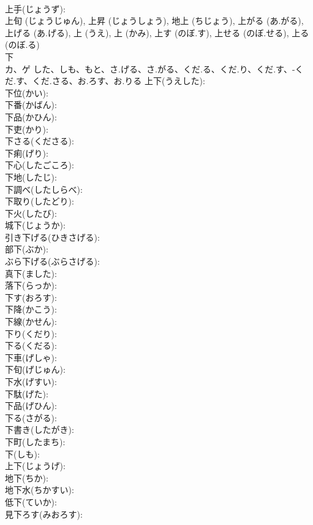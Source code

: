 \documentclass[8pt]{extreport}
\begin{document}
\begin{CJK}{UTF8}{min}
\\	上手(じょうず): 
\\	上旬 (じょうじゅん), 上昇 (じょうしょう), 地上 (ちじょう), 上がる (あ.がる), 上げる (あ.げる), 上 (うえ), 上 (かみ), 上す (のぼ.す), 上せる (のぼ.せる), 上る (のぼ.る)
\\	下			
\\	カ、ゲ	した、しも、もと、さ.げる、さ.がる、くだ.る、くだ.り、くだ.す、-くだ.す、くだ.さる、お.ろす、お.りる	上下(うえした): 
\\	下位(かい): 
\\	下番(かばん): 
\\	下品(かひん): 
\\	下吏(かり): 
\\	下さる(くださる): 
\\	下痢(げり): 
\\	下心(したごころ): 
\\	下地(したじ): 
\\	下調べ(したしらべ): 
\\	下取り(したどり): 
\\	下火(したび): 
\\	城下(じょうか): 
\\	引き下げる(ひきさげる): 
\\	部下(ぶか): 
\\	ぶら下げる(ぶらさげる): 
\\	真下(ました): 
\\	落下(らっか): 
\\	下す(おろす): 
\\	下降(かこう): 
\\	下線(かせん): 
\\	下り(くだり): 
\\	下る(くだる): 
\\	下車(げしゃ): 
\\	下旬(げじゅん): 
\\	下水(げすい): 
\\	下駄(げた): 
\\	下品(げひん): 
\\	下る(さがる): 
\\	下書き(したがき): 
\\	下町(したまち): 
\\	下(しも): 
\\	上下(じょうげ): 
\\	地下(ちか): 
\\	地下水(ちかすい): 
\\	低下(ていか): 
\\	見下ろす(みおろす): 

\end{CJK}
\end{document}
